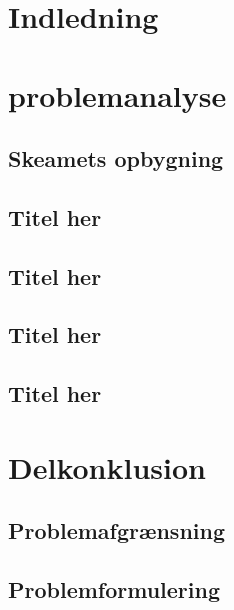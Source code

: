 \section{Indledning}
  

\section{problemanalyse}
\subsection{Skeamets opbygning}
  

\subsection{Titel her}
  

\subsection{Titel her}
  

\subsection{Titel her}
  

\subsection{Titel her}
  

\section{Delkonklusion}
  

\subsection{Problemafgrænsning}
  

\subsection{Problemformulering}
  

